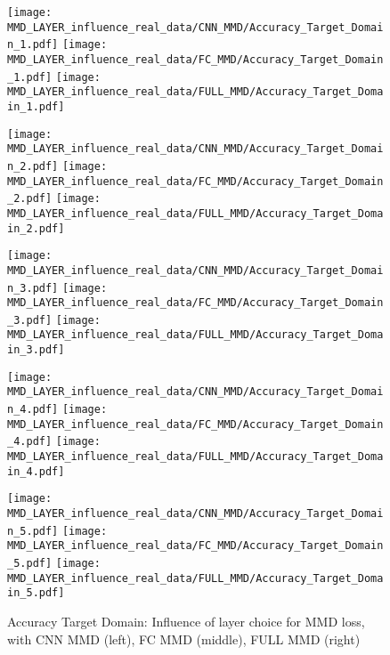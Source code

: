 \begin{figure}[H]
  \centering

  \texttt{[image: MMD\_LAYER\_influence\_real\_data/CNN\_MMD/Accuracy\_Target\_Domain\_1.pdf]}
  \texttt{[image: MMD\_LAYER\_influence\_real\_data/FC\_MMD/Accuracy\_Target\_Domain\_1.pdf]}
  \texttt{[image: MMD\_LAYER\_influence\_real\_data/FULL\_MMD/Accuracy\_Target\_Domain\_1.pdf]}

  \vspace{.1cm}

  \texttt{[image: MMD\_LAYER\_influence\_real\_data/CNN\_MMD/Accuracy\_Target\_Domain\_2.pdf]}
  \texttt{[image: MMD\_LAYER\_influence\_real\_data/FC\_MMD/Accuracy\_Target\_Domain\_2.pdf]}
  \texttt{[image: MMD\_LAYER\_influence\_real\_data/FULL\_MMD/Accuracy\_Target\_Domain\_2.pdf]}

  \vspace{.1cm}

  \texttt{[image: MMD\_LAYER\_influence\_real\_data/CNN\_MMD/Accuracy\_Target\_Domain\_3.pdf]}
  \texttt{[image: MMD\_LAYER\_influence\_real\_data/FC\_MMD/Accuracy\_Target\_Domain\_3.pdf]}
  \texttt{[image: MMD\_LAYER\_influence\_real\_data/FULL\_MMD/Accuracy\_Target\_Domain\_3.pdf]}
  
    \vspace{.1cm}

  \texttt{[image: MMD\_LAYER\_influence\_real\_data/CNN\_MMD/Accuracy\_Target\_Domain\_4.pdf]}
  \texttt{[image: MMD\_LAYER\_influence\_real\_data/FC\_MMD/Accuracy\_Target\_Domain\_4.pdf]}
  \texttt{[image: MMD\_LAYER\_influence\_real\_data/FULL\_MMD/Accuracy\_Target\_Domain\_4.pdf]}
  
    \vspace{.1cm}
    
  \texttt{[image: MMD\_LAYER\_influence\_real\_data/CNN\_MMD/Accuracy\_Target\_Domain\_5.pdf]}
  \hspace{.1cm}
  \texttt{[image: MMD\_LAYER\_influence\_real\_data/FC\_MMD/Accuracy\_Target\_Domain\_5.pdf]}
  \texttt{[image: MMD\_LAYER\_influence\_real\_data/FULL\_MMD/Accuracy\_Target\_Domain\_5.pdf]}


  \caption{Accuracy Target Domain: Influence of layer choice for MMD loss, with CNN MMD (left), FC MMD (middle), FULL MMD (right)}
  \label{fig:target_accuracy_MMD_layer}
\end{figure}